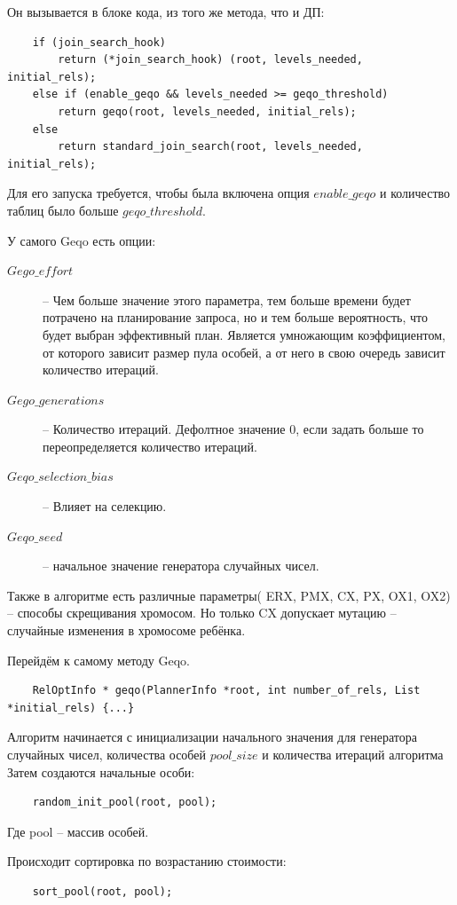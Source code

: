 \documentclass[12pt]{article}
\begin{document}
\begin{flushleft}
Он вызывается в блоке кода, из того же метода, что и ДП:
\begin{lstlisting}
    if (join_search_hook)
        return (*join_search_hook) (root, levels_needed, initial_rels);
    else if (enable_geqo && levels_needed >= geqo_threshold)
        return geqo(root, levels_needed, initial_rels);
    else
        return standard_join_search(root, levels_needed, initial_rels);
\end{lstlisting}

Для его запуска требуется, чтобы была включена опция $enable\_geqo$ 
и количество таблиц было больше $geqo\_threshold$.

У самого Geqo есть опции:
\begin{description}
    \item [$Gego\_effort$] -- Чем больше значение этого параметра, 
    тем больше времени будет потрачено на планирование запроса, 
    но и тем больше вероятность, что будет выбран эффективный план.
    Является умножающим коэффициентом, от которого зависит размер пула особей, а от него в свою очередь
    зависит количество итераций.
    \item [$Gego\_generations$] -- Количество итераций. Дефолтное значение 0, если задать больше то 
    переопределяется количество итераций.
    \item [$Geqo\_selection\_bias$] -- Влияет на селекцию.
    \item [$Geqo\_seed$] -- начальное значение генератора случайных чисел.
\end{description}
Также в алгоритме есть различные параметры( ERX, PMX, CX, PX, OX1, OX2) -- способы скрещивания хромосом.
Но только CX допускает мутацию -- случайные изменения в хромосоме ребёнка.

Перейдём к самому методу Geqo.
\begin{lstlisting}
    RelOptInfo * geqo(PlannerInfo *root, int number_of_rels, List *initial_rels) {...}
\end{lstlisting}

Алгоритм начинается с инициализации начального значения для генератора случайных чисел, количества особей $pool\_size$ и количества итераций алгоритма %
Затем создаются начальные особи:
\begin{lstlisting}
    random_init_pool(root, pool);
\end{lstlisting}
Где pool -- массив особей.

Происходит сортировка по возрастанию стоимости:
\begin{lstlisting}
    sort_pool(root, pool);
\end{lstlisting}


\end{flushleft}
\end{document}

